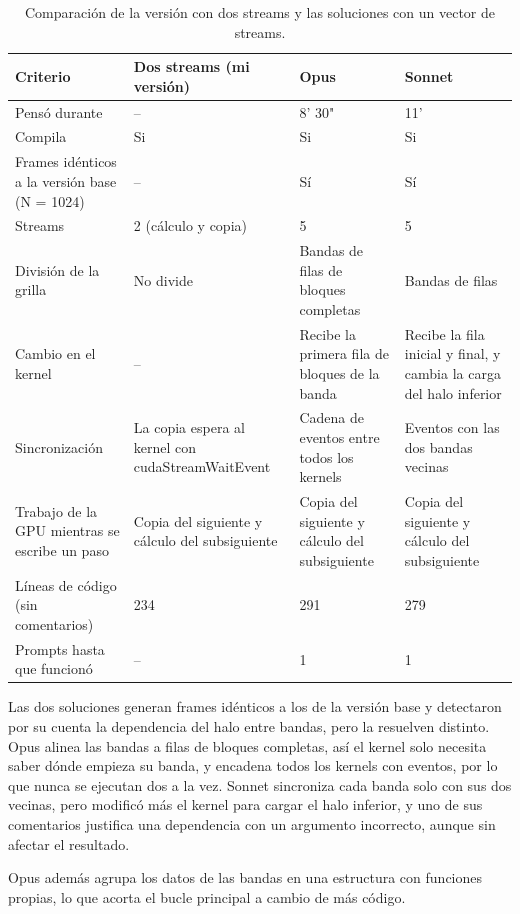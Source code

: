 \begin{table}[H]
  \centering
  \small
  \begin{tabular}{p{4cm}p{4cm}p{4cm}p{4cm}}
    \toprule
    Criterio & Dos streams (mi versión) & Opus & Sonnet \\
    \midrule
    Pensó durante & -- & 8' 30" & 11' \\
    Compila & Si & Si & Si \\
    Frames idénticos a la versión base (N = 1024) & -- & Sí & Sí \\
    Streams & 2 (cálculo y copia) & 5 & 5 \\
    División de la grilla & No divide & Bandas de filas de bloques completas & Bandas de filas \\
    Cambio en el kernel & -- & Recibe la primera fila de bloques de la banda & Recibe la fila inicial y final, y cambia la carga del halo inferior \\
    Sincronización & La copia espera al kernel con cudaStream\-WaitEvent & Cadena de eventos entre todos los kernels & Eventos con las dos bandas vecinas \\
    Trabajo de la GPU mientras se escribe un paso & Copia del siguiente y cálculo del subsiguiente & Copia del siguiente y cálculo del subsiguiente & Copia del siguiente y cálculo del subsiguiente \\
    Líneas de código (sin comentarios) & 234 & 291 & 279 \\
    Prompts hasta que funcionó & -- & 1 & 1 \\
    \bottomrule
  \end{tabular}
  \caption{Comparación de la versión con dos streams y las soluciones con un vector de streams.}
  \label{tab:ia_comparacion}
\end{table}

Las dos soluciones generan frames idénticos a los de la versión base y detectaron por su cuenta la dependencia del halo entre bandas, pero la resuelven distinto. Opus alinea las bandas a filas de bloques completas, así el kernel solo necesita saber dónde empieza su banda, y encadena todos los kernels con eventos, por lo que nunca se ejecutan dos a la vez. Sonnet sincroniza cada banda solo con sus dos vecinas, pero modificó más el kernel para cargar el halo inferior, y uno de sus comentarios justifica una dependencia con un argumento incorrecto, aunque sin afectar el resultado.

Opus además agrupa los datos de las bandas en una estructura con funciones propias, lo que acorta el bucle principal a cambio de más código.


